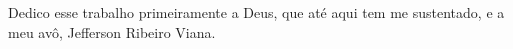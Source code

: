 \begin{dedicatoria}
  \vspace*{\fill}
  \hspace{0.2\textwidth}
  \begin{minipage}{0.8\textwidth}
 Dedico esse trabalho primeiramente a Deus, que até aqui tem me sustentado, e a meu avô, Jefferson Ribeiro Viana.
  \end{minipage}
\end{dedicatoria}